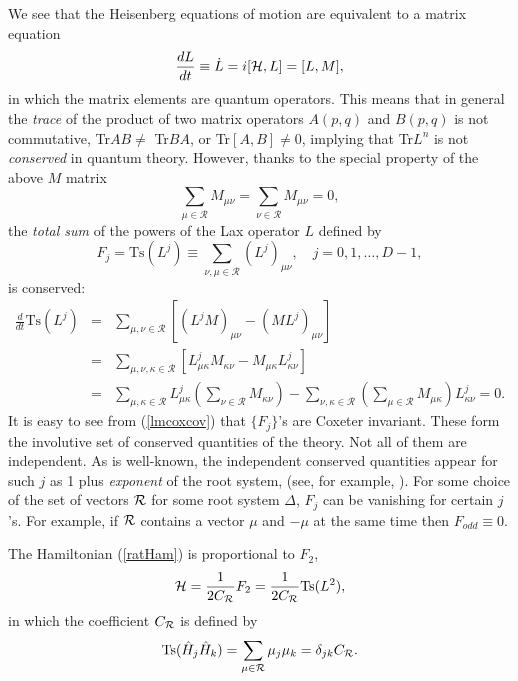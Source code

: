 \documentclass[a4paper,12pt]{article}
\begin{document}
We see that the Heisenberg equations of motion are equivalent to a
matrix equation \cite{bms,kps}
\begin{equation}
  {dL\over{dt}}\equiv\dot{L}=i[{\mathcal H},L]=[L,M],
\end{equation}
in which the matrix elements are quantum operators. This means that
in general the {\em trace} of the product of
two matrix operators $A(p,q)$ and
$B(p,q)$  is not commutative, Tr$AB\neq$ Tr$BA$, or Tr$[A,B]\neq0$,
implying that Tr$L^{n}$ is not {\em conserved} in quantum theory.
However, thanks to the special property of the above $M$ matrix
\begin{equation}
    \sum_{\mu\in\mathcal{R}}M_{\mu\nu}
=\sum_{\nu\in\mathcal{R}}M_{\mu\nu}=0,
    \label{zerosum}
\end{equation}
the {\em total sum} of the powers of the Lax operator $L$ defined by
\begin{equation}
   F_{j}= \mbox{Ts}(L^j)\equiv\sum_{\nu,\mu\in{\mathcal
   R}}(L^j)_{\mu\nu},
   \quad j=0,1,\ldots, D-1,
    \label{jtotsum}
\end{equation}
is conserved:
\begin{eqnarray*}
 \frac{d}{dt}\mbox{Ts}(L^j) &= &\sum_{\mu,\nu\in{\mathcal
  R}}\left[(L^jM)_{\mu\nu}-(ML^j)_{\mu\nu}\right]\\
  &=& \sum_{\mu,\nu, \kappa\in{\mathcal R}}\left[
  L^j_{\mu\kappa}M_{\kappa\nu}-M_{\mu\kappa}L^j_{\kappa\nu}\right]\\
  &=& \sum_{\mu,\kappa\in{\mathcal R}}L^j_{\mu\kappa}
(\sum_{\nu\in{\mathcal
  R}}M_{\kappa\nu})- \sum_{\nu,\kappa\in{\mathcal R}}
(\sum_{\mu\in{\mathcal
  R}}M_{\mu\kappa})L^j_{\kappa\nu}=0.
\end{eqnarray*}
It is easy to see  from (\ref{lmcoxcov}) that $\{F_j\}$'s
are Coxeter invariant.
These form the involutive set of conserved quantities of the theory.
Not all of them are independent. As is well-known, the independent
conserved quantities appear for such $j$  as 1 plus {\em exponent}
of the root system, (see, for example, \cite{kps,ks2}).
For some choice of the set of vectors ${\cal R}$ for some root system
$\Delta$,
$F_j$ can be vanishing for certain $j$'s.
For example, if ${\cal R}$ contains a vector $\mu$ and $-\mu$ at the same
time
then $F_{odd}\equiv0$.

The Hamiltonian (\ref{ratHam}) is proportional to $F_{2}$,
\begin{equation}
 {\cal H}={1\over{2C_{\cal R}}} F_{2}
={1\over{2C_{\cal R}}}\mbox{Ts}(L^2),
\end{equation}
in which the coefficient $C_{\cal R}$ is defined by
\begin{equation}
   \mbox{Ts}(\hat{H}_j\hat{H}_k)
=\sum_{\mu\in{\cal R}}\mu_j\mu_k=\delta_{jk}
C_{\cal R}.
\label{defcr}
\end{equation}
\end{document}
